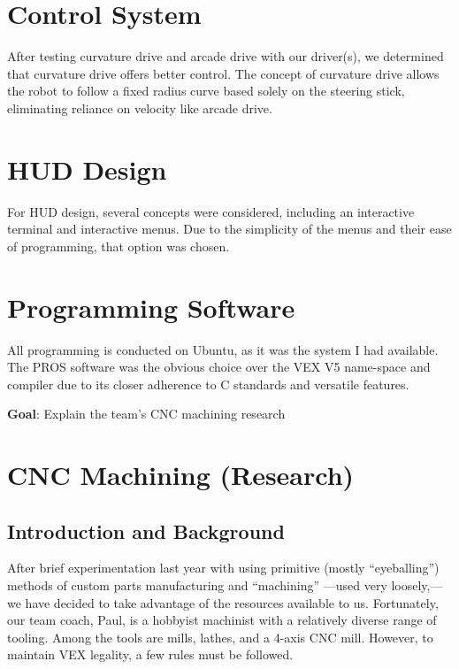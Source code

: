 \section*{Control System}
After testing curvature drive and arcade drive with our driver(s), we determined that curvature drive offers better control. The concept of curvature drive allows the robot to follow a fixed radius curve based solely on the steering stick, eliminating reliance on velocity like arcade drive.

\section*{HUD Design}
For HUD design, several concepts were considered, including an interactive terminal and interactive menus. Due to the simplicity of the menus and their ease of programming, that option was chosen.

\section*{Programming Software}
All programming is conducted on Ubuntu, as it was the system I had available. The PROS software was the obvious choice over the VEX V5 name-space and compiler due to its closer adherence to C standards and versatile features.

\label{CNC-Machining}


\textbf{Goal}: Explain the team's CNC machining research

\section*{CNC Machining (Research)}

\subsection*{Introduction and Background}
After brief experimentation last year with using primitive (mostly “eyeballing”) methods of custom parts manufacturing and “machining” —used very loosely,— we have decided to take advantage of the resources available to us. Fortunately, our team coach, Paul, is a hobbyist machinist with a relatively diverse range of tooling. Among the tools are mills, lathes, and a 4-axis CNC mill. However, to maintain VEX legality, a few rules must be followed.

